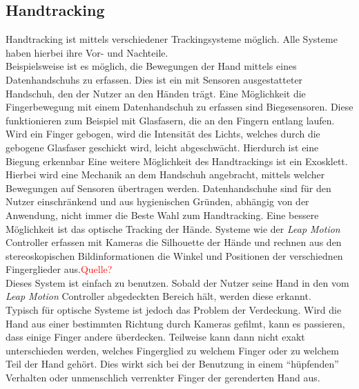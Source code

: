 

\subsection{Handtracking}\label{sec:HandtrackingAnwendungen}

Handtracking ist mittels verschiedener Trackingsysteme möglich. Alle Systeme haben hierbei ihre Vor- und Nachteile.\\
Beispielsweise ist es möglich, die Bewegungen der Hand mittels eines Datenhandschuhs zu erfassen. Dies ist ein mit Sensoren ausgestatteter Handschuh, den der Nutzer an den Händen trägt. Eine Möglichkeit die Fingerbewegung mit einem Datenhandschuh zu erfassen sind Biegesensoren. Diese funktionieren zum Beispiel mit Glasfasern, die an den Fingern entlang laufen. Wird ein Finger gebogen, wird die Intensität des Lichts, welches durch die gebogene Glasfaser geschickt wird, leicht abgeschwächt. Hierdurch ist eine Biegung erkennbar \cite{DoernerBrollEtAl2013}
Eine weitere Möglichkeit des Handtrackings ist ein Exosklett. Hierbei wird eine Mechanik an dem Handschuh angebracht, mittels welcher Bewegungen auf Sensoren übertragen werden.\cite{DoernerBrollEtAl2013}
Datenhandschuhe sind für den Nutzer einschränkend und aus hygienischen Gründen, abhängig von der Anwendung,  nicht immer die Beste Wahl zum Handtracking.
Eine bessere Möglichkeit ist das optische Tracking der Hände. Systeme wie der \textit{Leap Motion} Controller erfassen mit Kameras die Silhouette der Hände und rechnen aus den stereoskopischen Bildinformationen die Winkel und Positionen der verschiednen Fingerglieder aus.\textcolor{red}{Quelle?}\\
Dieses System ist einfach zu benutzen. Sobald der Nutzer seine Hand in den vom \emph{Leap Motion} Controller abgedeckten Bereich hält, werden diese erkannt.\\
Typisch für optische Systeme ist jedoch das Problem der Verdeckung. Wird die Hand aus einer bestimmten Richtung durch Kameras gefilmt, kann es passieren, dass einige Finger andere überdecken. Teilweise kann dann nicht exakt unterschieden werden, welches Fingerglied zu welchem Finger oder zu welchem Teil der Hand gehört. Dies wirkt sich bei der Benutzung in einem "`hüpfenden"' Verhalten oder unmenschlich verrenkter Finger der gerenderten Hand aus.

